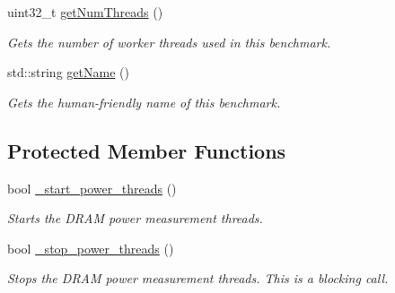 \begin{DoxyCompactItemize}
uint32\-\_\-t \hyperlink{classxmem_1_1benchmark_1_1_benchmark_ad38e0629d25ae4177d4915f1aafd65f1}{get\-Num\-Threads} ()
\begin{DoxyCompactList}\small\item\em Gets the number of worker threads used in this benchmark. \end{DoxyCompactList}\item 
std\-::string \hyperlink{classxmem_1_1benchmark_1_1_benchmark_a18883dec146e768436c35946d40ab659}{get\-Name} ()
\begin{DoxyCompactList}\small\item\em Gets the human-\/friendly name of this benchmark. \end{DoxyCompactList}\end{DoxyCompactItemize}
\subsection*{Protected Member Functions}
\begin{DoxyCompactItemize}
\item 
bool \hyperlink{classxmem_1_1benchmark_1_1_benchmark_aaab5c124256e59540e061533323c64d7}{\-\_\-start\-\_\-power\-\_\-threads} ()
\begin{DoxyCompactList}\small\item\em Starts the D\-R\-A\-M power measurement threads. \end{DoxyCompactList}\item 
bool \hyperlink{classxmem_1_1benchmark_1_1_benchmark_a1c485c6f7fb6bbde588220d12129fa8e}{\-\_\-stop\-\_\-power\-\_\-threads} ()
\begin{DoxyCompactList}\small\item\em Stops the D\-R\-A\-M power measurement threads. This is a blocking call. \end{DoxyCompactList}\end{DoxyCompactItemize}
